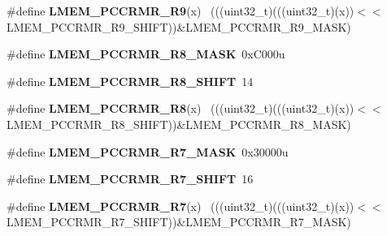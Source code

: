 \begin{DoxyCompactItemize}
\item 
\hypertarget{group___l_m_e_m___register___masks_ga77bebcdb45b7ecf5439c89641029bc84}{}\#define {\bfseries L\+M\+E\+M\+\_\+\+P\+C\+C\+R\+M\+R\+\_\+\+R9}(x)                                            ~(((uint32\+\_\+t)(((uint32\+\_\+t)(x))$<$$<$L\+M\+E\+M\+\_\+\+P\+C\+C\+R\+M\+R\+\_\+\+R9\+\_\+\+S\+H\+I\+F\+T))\&L\+M\+E\+M\+\_\+\+P\+C\+C\+R\+M\+R\+\_\+\+R9\+\_\+\+M\+A\+S\+K)\label{group___l_m_e_m___register___masks_ga77bebcdb45b7ecf5439c89641029bc84}

\item 
\hypertarget{group___l_m_e_m___register___masks_gadb06bff32258d1a40a09b89d01cb298d}{}\#define {\bfseries L\+M\+E\+M\+\_\+\+P\+C\+C\+R\+M\+R\+\_\+\+R8\+\_\+\+M\+A\+S\+K}~0x\+C000u\label{group___l_m_e_m___register___masks_gadb06bff32258d1a40a09b89d01cb298d}

\item 
\hypertarget{group___l_m_e_m___register___masks_ga761edc8e4ea2164be38cebce9fcdd588}{}\#define {\bfseries L\+M\+E\+M\+\_\+\+P\+C\+C\+R\+M\+R\+\_\+\+R8\+\_\+\+S\+H\+I\+F\+T}~14\label{group___l_m_e_m___register___masks_ga761edc8e4ea2164be38cebce9fcdd588}

\item 
\hypertarget{group___l_m_e_m___register___masks_ga5e675a12579577d91555f3116bb98b03}{}\#define {\bfseries L\+M\+E\+M\+\_\+\+P\+C\+C\+R\+M\+R\+\_\+\+R8}(x)                                            ~(((uint32\+\_\+t)(((uint32\+\_\+t)(x))$<$$<$L\+M\+E\+M\+\_\+\+P\+C\+C\+R\+M\+R\+\_\+\+R8\+\_\+\+S\+H\+I\+F\+T))\&L\+M\+E\+M\+\_\+\+P\+C\+C\+R\+M\+R\+\_\+\+R8\+\_\+\+M\+A\+S\+K)\label{group___l_m_e_m___register___masks_ga5e675a12579577d91555f3116bb98b03}

\item 
\hypertarget{group___l_m_e_m___register___masks_ga15e92a3e2491ed5c78ed0e78aea6e271}{}\#define {\bfseries L\+M\+E\+M\+\_\+\+P\+C\+C\+R\+M\+R\+\_\+\+R7\+\_\+\+M\+A\+S\+K}~0x30000u\label{group___l_m_e_m___register___masks_ga15e92a3e2491ed5c78ed0e78aea6e271}

\item 
\hypertarget{group___l_m_e_m___register___masks_ga51f8f79845cf61c22a307666fc9eaa2c}{}\#define {\bfseries L\+M\+E\+M\+\_\+\+P\+C\+C\+R\+M\+R\+\_\+\+R7\+\_\+\+S\+H\+I\+F\+T}~16\label{group___l_m_e_m___register___masks_ga51f8f79845cf61c22a307666fc9eaa2c}

\item 
\hypertarget{group___l_m_e_m___register___masks_gabe8afb83df1e478b69e07f6a206f448d}{}\#define {\bfseries L\+M\+E\+M\+\_\+\+P\+C\+C\+R\+M\+R\+\_\+\+R7}(x)                                            ~(((uint32\+\_\+t)(((uint32\+\_\+t)(x))$<$$<$L\+M\+E\+M\+\_\+\+P\+C\+C\+R\+M\+R\+\_\+\+R7\+\_\+\+S\+H\+I\+F\+T))\&L\+M\+E\+M\+\_\+\+P\+C\+C\+R\+M\+R\+\_\+\+R7\+\_\+\+M\+A\+S\+K)\label{group___l_m_e_m___register___masks_gabe8afb83df1e478b69e07f6a206f448d}


\end{DoxyCompactItemize}
